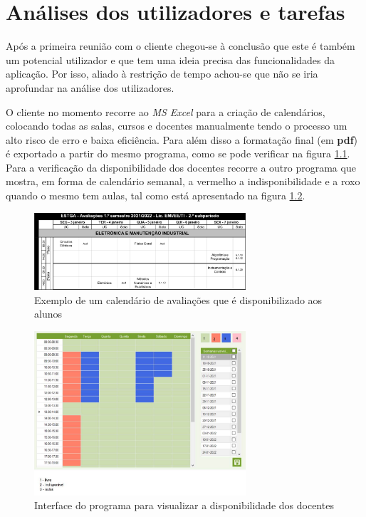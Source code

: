 \documentclass[11pt, twoside]{report}
\begin{document}
	
	
	\chapter{Análises dos utilizadores e tarefas}
	\label{analiseutilizador}
	
	Após a primeira reunião com o cliente chegou-se à conclusão que  este é também um potencial utilizador e que tem uma ideia precisa das funcionalidades da aplicação. Por isso, aliado à restrição de tempo achou-se que não se iria aprofundar na análise dos utilizadores. 
	
	O cliente no momento recorre ao \textit{MS Excel} para a criação de calendários,  colocando todas as salas, cursos e docentes manualmente tendo o processo um alto risco de erro e baixa eficiência.
	Para além disso a formatação final (em \textbf{pdf}) é exportado a partir do mesmo programa, como se pode verificar na figura \ref{calendarioatual}.
	Para a verificação da disponibilidade dos docentes recorre a outro programa que mostra, em forma de calendário semanal, a vermelho a indisponibilidade e a roxo quando o mesmo tem aulas, tal como está apresentado na figura \ref{disponibilidadedocentes}. 
	
	\begin{figure}[H] 
		\centering 
		\includegraphics[width=0.7\textwidth,height=0.7\textheight,keepaspectratio]{image/calendarioavaliacao}
		\caption{Exemplo de um calendário de avaliações que é disponibilizado aos alunos}
		\label{calendarioatual}
	\end{figure}

	\begin{figure}[H] 
		\centering 
		\includegraphics[width=0.7\textwidth,height=0.7\textheight,keepaspectratio]{image/ColorMap}
		\caption{Interface do programa para visualizar a disponibilidade dos docentes}
		\label{disponibilidadedocentes}
	\end{figure}
	
\end{document}
